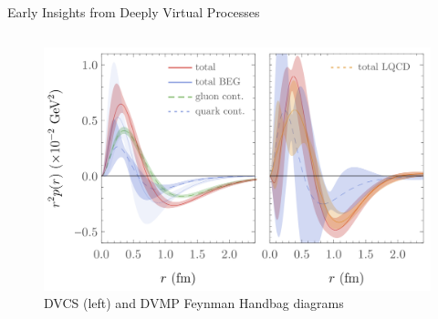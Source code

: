 \documentclass[aspectratio=169]{beamer}
\newcommand*{\myfont}{\fontfamily{lmtt}\selectfont}
\begin{document}
\begin{frame}{Early Insights from Deeply Virtual Processes}
\begin{columns}
\begin{figure}
                        \includegraphics[width=.95\textwidth]{defense/proton_pressure_theory.png}
                        \caption{ DVCS (left) and DVMP Feynman Handbag diagrams\\
                        {\myfont{\tiny  [V. Kubarovsky Nuc Phys B 2011]   }}}
                         
                    \end{figure} 
       
\end{columns}


\end{frame}
\end{document}
